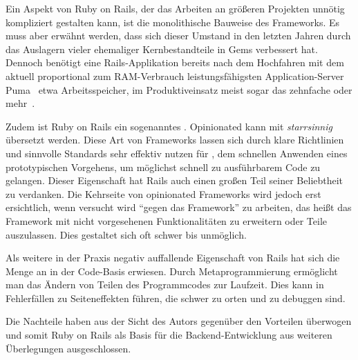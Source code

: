 Ein Aspekt von Ruby on Rails, der das Arbeiten an größeren Projekten unnötig
kompliziert gestalten kann, ist die monolithische Bauweise des Frameworks.  Es
muss aber erwähnt werden, dass sich dieser Umstand in den letzten Jahren durch
das Auslagern vieler ehemaliger Kernbestandteile in Gems verbessert hat.
Dennoch benötigt eine Rails-Applikation bereits nach dem Hochfahren mit dem
aktuell proportional zum RAM-Verbrauch leistungsfähigsten Application-Server
Puma~\cite{puma} etwa  Arbeitsspeicher, im Produktiveinsatz meist
sogar das zehnfache oder mehr~\cite{railsappservercomparison}.

Zudem ist Ruby on Rails ein sogenanntes .
Opinionated kann mit \emph{starrsinnig} übersetzt werden.  Diese Art von
Frameworks lassen sich durch klare Richtlinien und sinnvolle Standards sehr
effektiv nutzen für , dem schnellen
Anwenden eines prototypischen Vorgehens, um möglichst schnell zu ausführbarem
Code zu gelangen.  Dieser Eigenschaft hat Rails auch einen großen Teil seiner
Beliebtheit zu verdanken.  Die Kehrseite von opinionated Frameworks wird jedoch
erst ersichtlich, wenn versucht wird \enquote{gegen das Framework} zu arbeiten,
das heißt das Framework mit nicht vorgesehenen Funktionalitäten zu erweitern
oder Teile auszulassen.  Dies gestaltet sich oft schwer bis unmöglich.

Als weitere in der Praxis negativ auffallende Eigenschaft von Rails hat
sich die Menge an  in der Code-Basis erwiesen.
Durch Metaprogrammierung ermöglicht man das Ändern von Teilen des Programmcodes
zur Laufzeit. Dies kann in Fehlerfällen zu Seiteneffekten führen, die schwer zu
orten und zu debuggen sind.

Die Nachteile haben aus der Sicht des Autors gegenüber den Vorteilen überwogen
und somit Ruby on Rails als Basis für die Backend-Entwicklung aus weiteren
Überlegungen ausgeschlossen.
